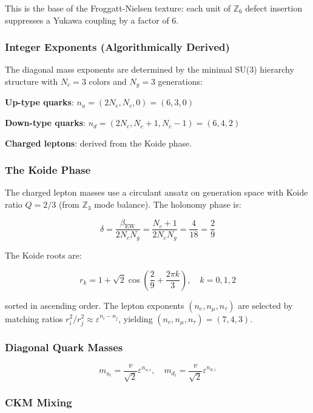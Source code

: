 This is the base of the Froggatt-Nielsen texture: each unit of \(\mathbb{Z}_6\) defect insertion suppresses a Yukawa coupling by a factor of 6.

\subsubsection{Integer Exponents (Algorithmically Derived)}\label{62-integer-exponents-algorithmically-derived}

The diagonal mass exponents are determined by the minimal SU(3) hierarchy structure with \(N_c = 3\) colors and \(N_g = 3\) generations:

\textbf{Up-type quarks}: \(n_u = (2N_c, N_c, 0) = (6, 3, 0)\)

\textbf{Down-type quarks}: \(n_d = (2N_c, N_c+1, N_c-1) = (6, 4, 2)\)

\textbf{Charged leptons}: derived from the Koide phase.

\subsubsection{The Koide Phase}\label{63-the-koide-phase}

The charged lepton masses use a circulant ansatz on generation space with Koide ratio \(Q = 2/3\) (from \(\mathbb{Z}_3\) mode balance). The holonomy phase is:

\[\delta = \frac{\beta_{\text{EW}}}{2 N_c N_g} = \frac{N_c + 1}{2 N_c N_g} = \frac{4}{18} = \frac{2}{9}\]

The Koide roots are:

\[r_k = 1 + \sqrt{2}\cos\left(\frac{2}{9} + \frac{2\pi k}{3}\right), \quad k = 0, 1, 2\]

sorted in ascending order. The lepton exponents \((n_e, n_\mu, n_\tau)\) are selected by matching ratios \(r_i^2/r_j^2 \approx \varepsilon^{n_i - n_j}\), yielding \((n_e, n_\mu, n_\tau) = (7, 4, 3)\).

\subsubsection{Diagonal Quark Masses}\label{64-diagonal-quark-masses}

\[m_{u_i} = \frac{v}{\sqrt{2}} \varepsilon^{n_{u,i}}, \quad m_{d_i} = \frac{v}{\sqrt{2}} \varepsilon^{n_{d,i}}\]

\subsubsection{CKM Mixing}\label{65-ckm-mixing}

